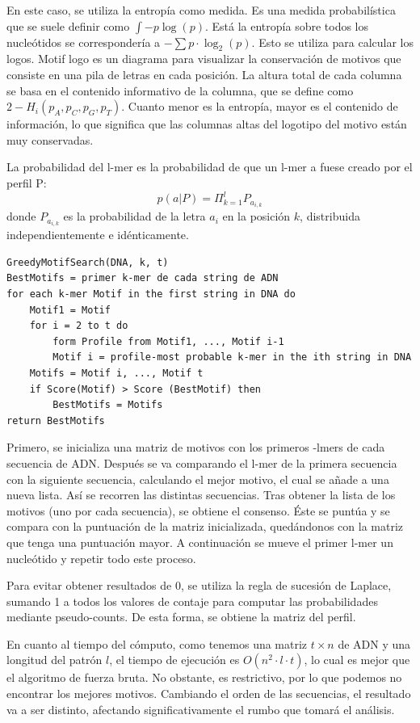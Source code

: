 En este caso, se utiliza la entropía como medida. Es una medida probabilística que se suele definir como $\int -p \log (p)$. Está la entropía sobre todos los nucleótidos se correspondería a $- \sum p \cdot \log_2(p)$. Esto se utiliza para calcular los logos. Motif logo es un diagrama para visualizar la conservación de motivos que consiste en una pila de letras en cada posición. La altura total de cada columna se basa en el contenido informativo de la columna, que se define como $2 - H_i(p_A, p_C, p_G, p_T)$. Cuanto menor es la entropía, mayor es el contenido de información, lo que significa que las columnas altas del logotipo del motivo están muy conservadas. 

La probabilidad del l-mer es la probabilidad de que un l-mer a fuese creado por el perfil P:
$$p(a|P) = \Pi^l_{k=1} P_{a_{i,k}}$$ 
donde $P_{a_{i,k}}$ es la probabilidad de la letra $a_i$ en la posición $k$, distribuida independientemente e idénticamente. 

\begin{lstlisting}
GreedyMotifSearch(DNA, k, t)
BestMotifs = primer k-mer de cada string de ADN
for each k-mer Motif in the first string in DNA do
	Motif1 = Motif
	for i = 2 to t do
		form Profile from Motif1, ..., Motif i-1
		Motif i = profile-most probable k-mer in the ith string in DNA
	Motifs = Motif i, ..., Motif t
	if Score(Motif) > Score (BestMotif) then
		BestMotifs = Motifs
return BestMotifs
\end{lstlisting}

Primero, se inicializa una matriz de motivos con los primeros -lmers de cada secuencia de ADN. Después se va comparando el l-mer de la primera secuencia con la siguiente secuencia, calculando el mejor motivo, el cual se añade a una nueva lista. Así se recorren las distintas secuencias. Tras obtener la lista de los motivos (uno por cada secuencia), se obtiene el consenso. Éste se puntúa y se compara con la puntuación de la matriz inicializada, quedándonos con la matriz que tenga una puntuación mayor. A continuación se mueve el primer l-mer un nucleótido y repetir todo este proceso.

Para evitar obtener resultados de 0, se utiliza la regla de sucesión de Laplace, sumando 1 a todos los valores de contaje para computar las probabilidades mediante pseudo-counts. De esta forma, se obtiene la matriz del perfil. 

En cuanto al tiempo del cómputo, como tenemos una matriz $t \times n$ de ADN y una longitud del patrón $l$, el tiempo de ejecución es $O(n^2 \cdot l \cdot t)$, lo cual es mejor que el algoritmo de fuerza bruta. No obstante, es restrictivo, por lo que podemos no encontrar los mejores motivos. Cambiando el orden de las secuencias, el resultado va a ser distinto, afectando significativamente el rumbo que tomará el análisis. 

